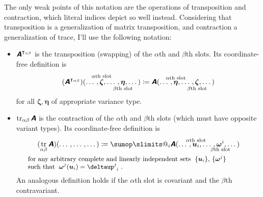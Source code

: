 \documentclass[\ifafour a4paper,12pt,\else a5paper,10pt,\fi%
onecolumn,oneside,article,%
british%
]{memoir}
\makeatletter
\theoremstyle{remark}
\theoremstyle{innote}
\def\sum{\DOTSI\sumop\slimits@}
\newcommand*{\mathte}[1]{\textbf{\textit{\textsf{#1}}}}
\newcommand*{\delt}{\deltaup}%
\DeclareMathOperator{\tr}{tr}%
\newcommand*{\defd}{\coloneqq}
\DeclarePairedDelimiter\set{\{}{\}}
\renewcommand*{\|}[1][]{\nonscript\,#1\vert\nonscript\;\mathopen{}}
\newcommand*{\tsum}{\mathop{\textstyle\sum}\nolimits}
\newcommand*{\yA}{\mathte{A}}
\renewcommand*{\i}{\indices}
\newcommand*{\id}{\mathbf{id}}%
\makeatother
\begin{document}
The only weak points of this notation are the operations of transposition
and contraction, which literal indices depict so well instead. Considering
that transposition is a generalization of matrix transposition, and
contraction a generalization of trace, I'll use the following notation:
\begin{itemize}[wide]%
\item $\yA^{\intercal_{\alpha\beta}}$ is the transposition
  (swapping) of the $\alpha$th and $\beta$th slots. Its coordinate-free
  definition is
  \begin{equation}
    \label{eq:def_transp}
    (\yA^{\intercal_{\alpha\beta}})(\dotso,
    \overset{\mathclap{\scriptstyle\text{$\alpha$th slot}}}{\bm{\zeta}}
    ,\dotso,
    \underset{\mathclap{\scriptstyle\text{$\beta$th slot}}}{\bm{\eta}}
    ,\dotso)
    \defd
    \yA(\dotso,
    \overset{\mathclap{\scriptstyle\text{$\alpha$th slot}}}{\bm{\eta}}
    ,\dotso,
    \underset{\mathclap{\scriptstyle\text{$\beta$th slot}}}{\bm{\zeta}}
    ,\dotso)
  \end{equation}
  for all $\bm{\zeta},\bm{\eta}$ of appropriate variance type.
\item $\tr_{\alpha\beta}\yA$ is the contraction of the $\alpha$th and
  $\beta$th slots (which must have opposite variant types). Its
  coordinate-free definition is
  \begin{equation}
    \label{eq:def_contr}
    \begin{gathered}
      (\tr_{\alpha\beta}\yA)(\dotso
        ,\dotso
        ,\dotso)
        \defd
        \sum_{i} \yA(\dotso,
        \overset{\mathclap{\scriptstyle\text{$\alpha$th slot}}}{\bm{u}_{i}}
        ,\dotso,
        \underset{\mathclap{\scriptstyle\text{$\beta$th slot}}}{\bm{\omega}^{i}}
        ,\dotso)
      \\
      \parbox{0.9\columnwidth}{\small for any arbitrary complete and
        linearly independent sets \;$\set{\bm{u}_{i}}$,
        $\set{\bm{\omega}^{j}}$\\
        such that \;$\bm{\omega}^{j}(\bm{u}_{i}) = \delt\i{^{j}_{i}}$~.}
    \end{gathered}
  \end{equation}
  An analogous definition holds if the $\alpha$th slot is covariant and the
  $\beta$th contravariant.
\end{itemize}
\end{document}
